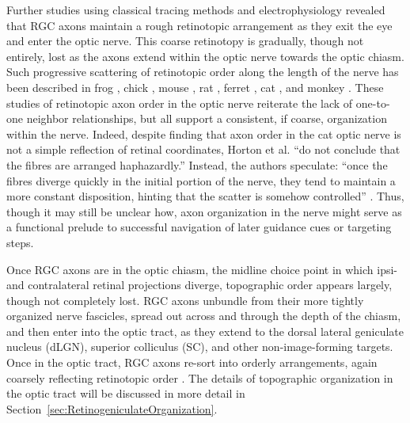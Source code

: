 Further studies using classical tracing methods and electrophysiology revealed that RGC axons maintain a rough retinotopic arrangement as they exit the eye and enter the optic nerve.
This coarse retinotopy is gradually, though not entirely, lost as the axons extend within the optic nerve towards the optic chiasm.
Such progressive scattering of retinotopic order along the length of the nerve has been described in frog \cite{montgomery1998organization}, chick \cite{ehrlich1984course}, mouse \cite{chan1999changes,plas2005pretarget}, rat \cite{simon1991relationship,chan1994changes}, ferret \cite{reese1993reestablishment}, cat \cite{horton1979non,naito1986course}, and monkey \cite{naito1994retinogeniculate}.
These studies of retinotopic axon order in the optic nerve reiterate the lack of one-to-one neighbor relationships, but all support a consistent, if coarse, organization within the nerve.
Indeed, despite finding that axon order in the cat optic nerve is not a simple reflection of retinal coordinates, Horton et al. ``do not conclude that the fibres are arranged haphazardly.''
Instead, the authors speculate: ``once the fibres diverge quickly in the initial portion of the nerve, they tend to maintain a more constant disposition, hinting that the scatter is somehow controlled'' \cite{horton1979non}.
Thus, though it may still be unclear how, axon organization in the nerve might serve as a functional prelude to successful navigation of later guidance cues or targeting steps.

Once RGC axons are in the optic chiasm, the midline choice point in which ipsi- and contralateral retinal projections diverge, topographic order appears largely, though not completely lost.
RGC axons unbundle from their more tightly organized nerve fascicles, spread out across and through the depth of the chiasm, and then enter into the optic tract, as they extend to the dorsal lateral geniculate nucleus (dLGN), superior colliculus (SC), and other non-image-forming targets.
Once in the optic tract, RGC axons re-sort into orderly arrangements, again coarsely reflecting retinotopic order \cite{torrealba1982studies,reh1983organization,reese1993reestablishment,chan1994changes,chan1999changes,plas2005pretarget}.
The details of topographic organization in the optic tract will be discussed in more detail in Section~\ref{sec:RetinogeniculateOrganization}.

